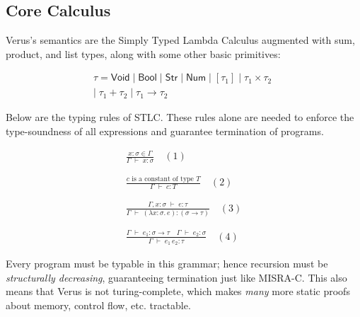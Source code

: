 \documentclass[conference]{IEEEtran}
\begin{document}
\subsection{Core Calculus}
Verus’s semantics are the Simply Typed Lambda Calculus augmented with sum, product, and list types, along with some other basic primitives:

\[
\begin{array}{c}
\tau = \textsf{Void}\;|\;\textsf{Bool}\;|\;\textsf{Str}\;|\;\textsf{Num}\;|\;
          [\tau_1]\;|\;
          \tau_1\times\tau_2\;\\|\;
          \tau_1+\tau_2\;|\;
          \tau_1\to\tau_2
\end{array}
\]

Below are the typing rules of STLC. These rules alone are needed to enforce the type-soundness of all expressions and guarantee termination of programs.

\[
\begin{array}{c}
\displaystyle
\frac{x:\sigma \in \Gamma}{\Gamma \;\vdash\; x:\sigma}
\quad (1)
\\\\\\
\displaystyle
\frac{c \text{ is a constant of type } T}{\Gamma \;\vdash\; c:T}
\quad (2)
\\\\\\
\displaystyle
\frac{\Gamma , x:\sigma \;\vdash\; e:\tau}
     {\Gamma \;\vdash\; (\lambda x:\sigma.\,e):(\sigma \to \tau)}
\quad (3)
\\\\\\
\displaystyle
\frac{\Gamma \;\vdash\; e_1 : \sigma \!\to\! \tau
      \quad
      \Gamma \;\vdash\; e_2 : \sigma}
     {\Gamma \;\vdash\; e_1\, e_2 : \tau}
\quad (4)
\end{array}
\]

Every program must be typable in this grammar; hence recursion must be \emph{structurally decreasing}, guaranteeing termination just like MISRA-C. This also means that Verus is not turing-complete, which makes \emph{many} more static proofs about memory, control flow, etc. tractable.
\end{document}
